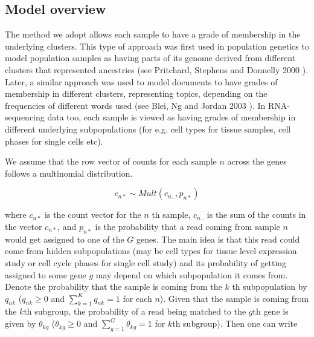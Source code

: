 %
%
%

\subsection{Model overview}

The method we adopt allows each sample to have a grade of membership in the underlying clusters. This type of approach was first used in population genetics to model population samples as having parts of its genome derived from different clusters that represented ancestries (see Pritchard, Stephens and Donnelly 2000 \cite{Pritchard2000}). Later, a similar approach was used to model documents to have grades of membership in different clusters, representing topics, depending on the frequencies of different words used (see Blei, Ng and Jordan 2003 \cite{Blei2003}). In RNA-sequencing data too, each sample is viewed as having grades of membership in different underlying subpopulations (for e.g. cell types for tissue samples, cell phases for single cells etc). 

We assume that the row vector of counts for each sample $n$ across the genes follows a multinomial distribution.

$$ c_{n*} \sim Mult(c_{n..}, p_{n*}) $$

where $c_{n*}$ is the count vector for the $n$ th sample, $c_{n..}$ is the sum of the counts in the vector $c_{n*}$, and $p_{n*}$ is the probability that a read coming from sample $n$ would get assigned to one of the $G$ genes. The main idea is that this read could come from hidden subpopulations (may be cell types for tissue level expression study or cell cycle phases for single cell study) and its probability of getting assigned to some gene $g$ may depend on which subpopulation it comes from. Denote  the probability that the sample is coming from the $k$ th subpopulation by $q_{nk}$ ($q_{nk} \geq 0$ and $\sum_{k=1}^{K} q_{nk} =1$ for each $n$).  Given that the sample is coming from the $k$th subgroup, the probability of a read being matched to the $g$th gene is given by $\theta_{kg}$ ($\theta_{kg} \geq 0$ and $\sum_{g=1}^{G} \theta_{kg} =1$ for $k$th subgroup). Then one can write 

